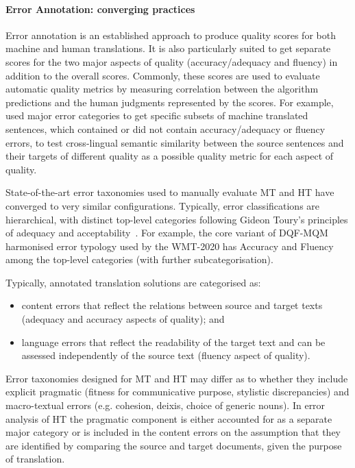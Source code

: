 \paragraph{Error Annotation: converging practices}
Error annotation is an established approach to produce quality scores for both machine and human translations. 
It is also particularly suited to get separate scores for the two major aspects of quality (accuracy/adequacy and fluency) in addition to the overall scores. Commonly, these scores are used to evaluate automatic quality metrics by measuring correlation between the algorithm predictions and the human judgments represented by the scores. 
For example, \citet{Ustaszewski2019} used major error categories to get specific subsets of machine translated sentences, which contained or did not contain accuracy/adequacy or fluency errors, to test cross-lingual semantic similarity between the source sentences and their targets of different quality as a possible quality metric for each aspect of quality. 

State-of-the-art error taxonomies used to manually evaluate MT and HT have converged to very similar configurations. Typically, error classifications are hierarchical, with distinct top-level categories following Gideon Toury's principles of adequacy and acceptability~\cite{Toury1995}. 
For example, the core variant of \gls{DQF}-\gls{MQM} harmonised error typology used by the WMT-2020 has Accuracy and Fluency among the top-level categories (with further subcategorisation). 

Typically, annotated translation solutions are categorised as:

\begin{itemize}\compresslist{}
	\item content errors that reflect the relations between source and target texts (adequacy and accuracy aspects of quality); and 
	\item language errors that reflect the readability of the target text and can be assessed independently of the source text (fluency aspect of quality). 
\end{itemize}

Error taxonomies designed for MT and HT may differ as to whether they include explicit pragmatic (fitness for communicative purpose, stylistic discrepancies) and macro-textual errors (e.g. cohesion, deixis, choice of generic nouns). In error analysis of HT the pragmatic component is either accounted for as a separate major category or is included in the content errors on the assumption that they are identified by comparing the source and target documents, given the purpose of translation. 

